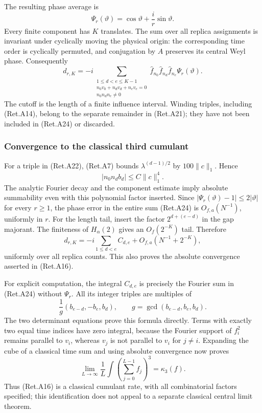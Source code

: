 The resulting phase average is
\[
             \Psi_r(\vartheta)=\cos\vartheta+
                                      \frac{i}{r}\sin\vartheta.
\]
Every finite component has \(K\) translates. The sum over all replica
assignments is invariant under cyclically moving the physical origin:
the corresponding time order is cyclically permuted, and conjugation
by \(A\) preserves its central Weyl phase.
Consequently
\[
 d_{r,K}=-i\!\!\sum_{\substack{1\le d<e\le K-1\\
                              n_0v_0+n_dv_d+n_ev_e=0\\
                              n_0n_dn_e\ne0}}
       \widehat f_{n_0}\widehat f_{n_d}\widehat f_{n_e}
                             \Psi_r(\vartheta).             \tag{Ret.A24}
\]
The cutoff is the length of a finite influence interval.
Winding triples, including (Ret.A14), belong to the separate remainder
in (Ret.A21); they have not been included in (Ret.A24) or discarded.

\hypertarget{convergence-to-the-classical-third-cumulant}{%
\subsubsection{Convergence to the classical third cumulant}\label{convergence-to-the-classical-third-cumulant}}

For a triple in (Ret.A22), (Ret.A7) bounds \(\lambda^{(d-1)/2}\)
by \(100\|c\|_1\). Hence
\[
 |n_0n_db_d|\le C\|c\|_1^4.
\]
The analytic Fourier decay and the component estimate imply absolute
summability even with this polynomial factor inserted.
Since \(|\Psi_r(\vartheta)-1|\le2|\vartheta|\) for every \(r\ge1\),
the phase error in the entire sum (Ret.A24) is \(O_{f,a}(N^{-1})\),
uniformly in \(r\).
For the length tail, insert the factor \(2^{d+(e-d)}\) in the
gap majorant. The finiteness of \(H_\alpha(2)\) gives
an \(O_f(2^{-K})\) tail. Therefore
\[
 d_{r,K}=-i\sum_{1\le d<e} C_{d,e}
                  +O_{f,a}(N^{-1}+2^{-K}),                \tag{Ret.A25}
\]
uniformly over all replica counts. This also proves the absolute
convergence asserted in (Ret.A16).

For explicit computation, the integral \(C_{d,e}\) is precisely the
Fourier sum in (Ret.A24) without \(\Psi_r\).
All its integer triples are multiples of
\[
 \frac1g(b_{e-d},-b_e,b_d),\qquad
             g=\gcd(b_{e-d},b_e,b_d).                       \tag{Ret.A26}
\]
The two determinant equations prove this formula directly.
Terms with exactly two equal time indices have zero integral, because
the Fourier support of \(f_i^2\) remains parallel to \(v_i\), whereas
\(v_j\) is not parallel to \(v_i\) for \(j\ne i\).
Expanding the cube of a classical time sum and using absolute
convergence now proves
\[
 \lim_{L\to\infty}\frac1L\int
                \left(\sum_{j=0}^{L-1}f_j\right)^3
                       =\kappa_3(f).
\]
Thus (Ret.A16) is a classical cumulant rate, with all combinatorial
factors specified; this identification does not appeal to a
separate classical central limit theorem.

